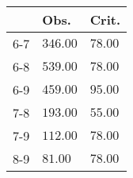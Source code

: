 \begin{table}[ht]
\centering
\begin{tabular}{rll}
  \hline
 & Obs. & Crit. \\ 
  \hline
6-7 & \(\mathbf{346.00}\) & \(\mathbf{78.00}\) \\ 
  6-8 & \(\mathbf{539.00}\) & \(\mathbf{78.00}\) \\ 
  6-9 & \(\mathbf{459.00}\) & \(\mathbf{95.00}\) \\ 
  7-8 & \(\mathbf{193.00}\) & \(\mathbf{55.00}\) \\ 
  7-9 & \(\mathbf{112.00}\) & \(\mathbf{78.00}\) \\ 
  8-9 & \(\mathbf{81.00}\) & \(\mathbf{78.00}\) \\ 
   \hline
\end{tabular}
\end{table}

